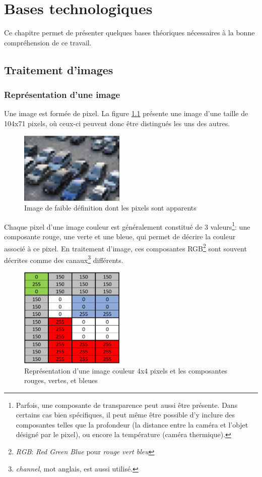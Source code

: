 \chapter{Bases technologiques}
Ce chapitre permet de présenter quelques bases théoriques nécessaires à la bonne compréhension de ce travail. 

\section{Traitement d'images}
\subsection{Représentation d'une image}\label{techno.traitement.repr}
Une image est formée de pixel. La figure \ref{fig:pixels} présente une image d'une taille de 104x71 pixels, où ceux-ci peuvent donc être distingués les uns des autres.

\begin{figure}[ht]
    \includegraphics[width=50mm]{img/bases_technologiques/pixels.png}
    \centering
    \caption{Image de faible définition dont les pixels sont apparents}
    \label{fig:pixels} 
\end{figure}

Chaque pixel d'une image couleur est généralement constitué de 3 valeurs\footnote{Parfois, une composante de transparence peut aussi être présente. Dans certains cas bien spécifiques, il peut même être possible d'y inclure des composantes telles que la profondeur (la distance entre la caméra et l'objet désigné par le pixel), ou encore la température (caméra thermique).}: une composante rouge, une verte et une bleue, qui permet de décrire la couleur associé à ce pixel. En traitement d'image, ces composantes RGB\footnote{\textit{RGB}: \textit{Red Green Blue} pour \textit{rouge vert bleu}} sont souvent décrites comme des canaux\footnote{\textit{channel}, mot anglais, est aussi utilisé.} différents.

\begin{figure}[ht]
    \includegraphics[width=50mm]{img/bases_technologiques/images_pixels.png}
    \centering
    \caption{Représentation d'une image couleur 4x4 pixels et les composantes rouges, vertes, et bleues}
\end{figure}

